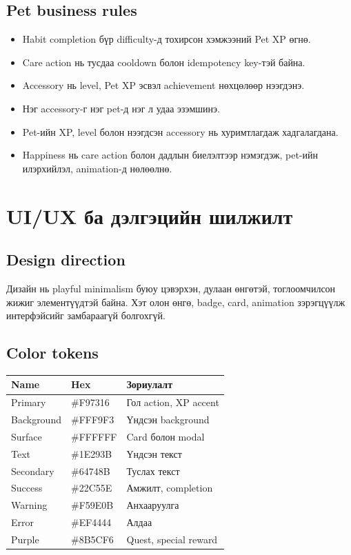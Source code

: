 \documentclass[12pt,a4paper,oneside]{report}
\begin{document}
\section{Pet business rules}
\begin{itemize}
  \item Habit completion бүр difficulty-д тохирсон хэмжээний Pet XP өгнө.
  \item Care action нь тусдаа cooldown болон idempotency key-тэй байна.
  \item Accessory нь level, Pet XP эсвэл achievement нөхцөлөөр нээгдэнэ.
  \item Нэг accessory-г нэг pet-д нэг л удаа эзэмшинэ.
  \item Pet-ийн XP, level болон нээгдсэн accessory нь хуримтлагдаж хадгалагдана.
  \item Happiness нь care action болон дадлын биелэлтээр нэмэгдэж, pet-ийн илэрхийлэл, animation-д нөлөөлнө.
\end{itemize}

\chapter{UI/UX ба дэлгэцийн шилжилт}

\section{Design direction}
Дизайн нь playful minimalism буюу цэвэрхэн, дулаан өнгөтэй, тоглоомчилсон жижиг элементүүдтэй байна. Хэт олон өнгө, badge, card, animation зэрэгцүүлж интерфэйсийг замбараагүй болгохгүй.

\section{Color tokens}
\begin{longtable}{p{}p{}p{}}
\toprule
\textbf{Name} & \textbf{Hex} & \textbf{Зориулалт}\\
\midrule
Primary & \#F97316 & Гол action, XP accent\\
Background & \#FFF9F3 & Үндсэн background\\
Surface & \#FFFFFF & Card болон modal\\
Text & \#1E293B & Үндсэн текст\\
Secondary & \#64748B & Туслах текст\\
Success & \#22C55E & Амжилт, completion\\
Warning & \#F59E0B & Анхааруулга\\
Error & \#EF4444 & Алдаа\\
Purple & \#8B5CF6 & Quest, special reward\\
\bottomrule
\end{longtable}
\end{document}
